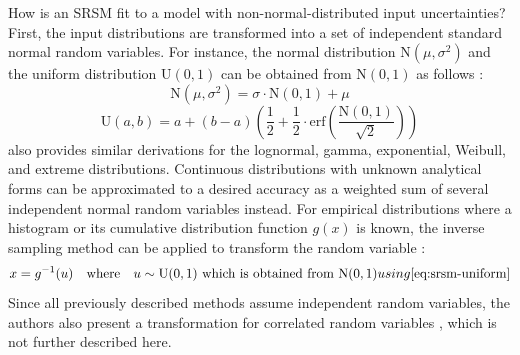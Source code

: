 \newpar How is an SRSM fit to a model with non-normal-distributed input uncertainties? First, the input distributions are transformed into a set of independent standard normal random variables. For instance, the normal distribution $\text{N}(\mu, \sigma^2)$ and the uniform distribution $\text{U}(0, 1)$ can be obtained from $\text{N}(0, 1)$ as follows \cite{srsm-phd-1999}:
\begin{equation*}
    \text{N}(\mu, \sigma^2) = \sigma \cdot \text{N}(0, 1) + \mu
\end{equation*}
\begin{equation} \label{eq:srsm-uniform}
    \text{U}(a, b) = a + (b-a) \left( \frac{1}{2} + \frac{1}{2} \cdot \text{erf}\left( \frac{\text{N}(0, 1)}{\sqrt{2}} \right) \right)
\end{equation}
\citeauthor{srsm-phd-1999} also provides similar derivations for the lognormal, gamma, exponential, Weibull, and extreme distributions. Continuous distributions with unknown analytical forms can be approximated to a desired accuracy as a weighted sum of several independent normal random variables instead. For empirical distributions where a histogram or its cumulative distribution function $g(x)$ is known, the inverse sampling method can be applied to transform the random variable \cite[p.~28]{rv-generation-1986}:
\begin{equation*}
    x = g^{-1}(u) \quad \text{where} \quad u \sim \text{U}(0, 1) \text{ which is obtained from N}(0, 1){ using \Cref{eq:srsm-uniform}}
\end{equation*}
Since all previously described methods assume independent random variables, the authors also present a transformation for correlated random variables \cite[pp.~42-43]{srsm-phd-1999}, which is not further described here.

